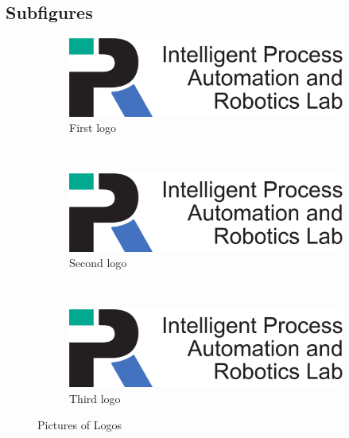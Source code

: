 \subsection{Subfigures}
\begin{figure}[H]
    \centering
    \begin{subfigure}[b]{0.3\textwidth}
        \includegraphics[width=\textwidth]{Aux/Logos/KIT-Departments/IPRLogo_en}
        \caption{First logo}
        \label{fig:logo1}
    \end{subfigure}
    ~ %
    \begin{subfigure}[b]{0.3\textwidth}
        \includegraphics[width=\textwidth]{Aux/Logos/KIT-Departments/IPRLogo_en}
        \caption{Second logo}
        \label{fig:logo2}
    \end{subfigure}
    ~ %
    \begin{subfigure}[b]{0.3\textwidth}
        \includegraphics[width=\textwidth]{Aux/Logos/KIT-Departments/IPRLogo_en}
        \caption{Third logo}
        \label{fig:logo3}
    \end{subfigure}
    \caption{Pictures of Logos}\label{fig:logos}
\end{figure}


